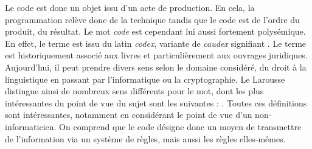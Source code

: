 \documentclass[12pt]{article} %
\begin{document}
Le code est donc un objet issu d'un acte de production. En cela, la programmation relève donc de la technique tandis que le code est de l'ordre du produit, du résultat. Le mot \textit{code} est cependant lui aussi fortement polysémique. En effet, le terme est issu du latin \textit{codex}, variante de \textit{caudex} signifiant . Le terme est historiquement associé aux livres et particulièrement aux ouvrages juridiques. Aujourd'hui, il peut prendre divers sens selon le domaine considéré, du droit à la linguistique en passant par l'informatique ou la cryptographie. Le Larousse distingue ainsi de nombreux sens différents pour le mot, dont les plus intéressantes du point de vue du sujet sont les suivantes :
\cite{Nimmo2017-ya}. Toutes ces définitions sont intéressantes, notamment en considérant le point de vue d'un non-informaticien. On comprend que le code désigne donc un moyen de transmettre de l'information via un système de règles, mais aussi les règles elles-mêmes. 
\end{document}
